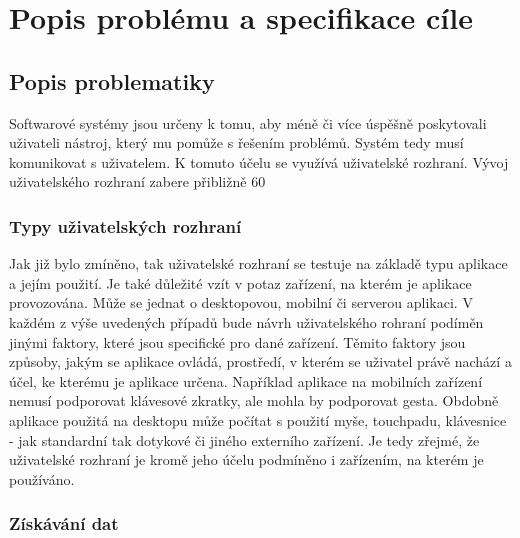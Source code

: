 \chapter{Popis problému a specifikace cíle}
\section{Popis problematiky}
Softwarové systémy jsou určeny k tomu, aby méně či více úspěšně poskytovali uživateli nástroj, který mu pomůže s řešením problémů. Systém tedy musí komunikovat s uživatelem. K tomuto účelu se využívá uživatelské rozhraní. Vývoj uživatelského rozhraní zabere přibližně 60%
\subsection{Typy uživatelských rozhraní}
Jak již bylo zmíněno, tak uživatelské rozhraní se testuje na základě typu aplikace a jejím použití. Je také důležité vzít v potaz zařízení, na kterém je aplikace provozována. Může se jednat o desktopovou, mobilní či serverou aplikaci. V každém z výše uvedených případů bude návrh uživatelského rohraní podíměn jinými faktory, které jsou specifické pro dané zařízení. Těmito faktory jsou způsoby, jakým se aplikace ovládá, prostředí, v kterém se uživatel právě nachází a účel, ke kterému je aplikace určena. Například aplikace na mobilních zařízení nemusí podporovat klávesové zkratky, ale mohla by podporovat gesta. Obdobně aplikace použitá na desktopu může počítat s použití myše, touchpadu, klávesnice - jak standardní tak dotykové či jiného externího zařízení. Je tedy zřejmé, že uživatelské rozhraní je kromě jeho účelu podmíněno i zařízením, na kterém je používáno.
\subsection{Získávání dat}
 